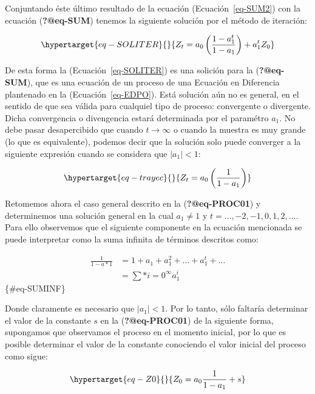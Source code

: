 \documentclass[
  a4paper,
]{article}
\begin{document}
Conjuntando éste último resultado de la ecuación
(Ecuación~\ref{eq-SUM2}) con la ecuación (\textbf{?@eq-SUM}) tenemos la
siguiente solución por el método de iteración:

\begin{equation}\protect\hypertarget{eq-SOLITER}{}{
Z_t = a_0 \left( \frac{1 - a^{t}_1}{1 - a_1} \right) + a^t_1 Z_0
}\label{eq-SOLITER}\end{equation}

De esta forma la (Ecuación~\ref{eq-SOLITER}) es una solición para la
(\textbf{?@eq-SUM}), que es una ecuación de un proceso de una Ecuación
en Diferencia plantenado en la (Ecuación~\ref{eq-EDPO}). Está solución
aún no es general, en el sentido de que sea válida para cualquiel tipo
de proceso: convergente o divergente. Dicha convergencia o divengencia
estará determinada por el paramétro \(a_1\). No debe pasar desapercibido
que cuando \(t \rightarrow \infty\) o cuando la muestra es muy grande
(lo que es equivalente), podemos decir que la solución solo puede
converger a la siguiente expresión cuando se considera que
\(|a_1| < 1\):

\begin{equation}\protect\hypertarget{eq-trayec}{}{
Z_t = a_0 \left( \frac{1}{1 - a_1} \right)
}\label{eq-trayec}\end{equation}

Retomemos ahora el caso general descrito en la (\textbf{?@eq-PROC01}) y
determinemos una solución general en la cual \(a_1 \neq 1\) y
\(t = \ldots, -2, -1, 0, 1, 2, \ldots\). Para ello observemos que el
siguiente componente en la ecuación mencionada se puede interpretar como
la suma infinita de términos descritos como:

\begin{align}
\frac{1}{1 - a*1} & = 1 + a_1 + a_1^2 + \ldots + a_1^t + \ldots \nonumber \\
& = \sum*{i = 0}^{\infty} a_1^{i}
\end{align} \{\#eq-SUMINF\}

Donde claramente es necesario que \(|a_1| < 1\). Por lo tanto, sólo
faltaría determinar el valor de la constante \(s\) en la
(\textbf{?@eq-PROC01}) de la siguiente forma, supongamos que observamos
el proceso en el momento inicial, por lo que es posible determinar el
valor de la constante conociendo el valor inicial del proceso como
sigue:

\begin{equation}\protect\hypertarget{eq-Z0}{}{
Z_0 = a_0 \frac{1}{1 - a_1} + s
}\label{eq-Z0}\end{equation}
\end{document}
